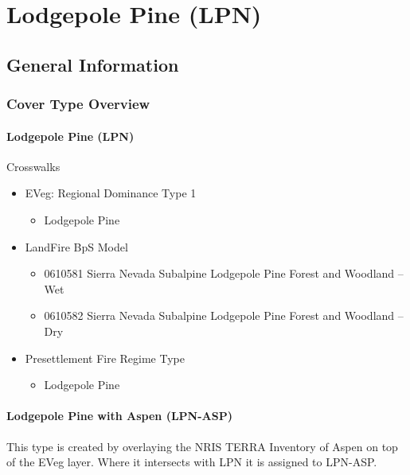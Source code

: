 
\section{Lodgepole Pine (LPN)}

\subsection{General Information}

\subsubsection{Cover Type Overview}

\paragraph{Lodgepole Pine (LPN)}

Crosswalks
\begin{itemize}
	\item EVeg: Regional Dominance Type 1
	\begin{itemize}
		\item Lodgepole Pine
	\end{itemize}

	\item LandFire BpS Model
	\begin{itemize}
		\item 0610581 Sierra Nevada Subalpine Lodgepole Pine Forest and Woodland – Wet
		\item 0610582 Sierra Nevada Subalpine Lodgepole Pine Forest and Woodland – Dry

	\end{itemize}

	\item Presettlement Fire Regime Type
	\begin{itemize}
		\item Lodgepole Pine
	\end{itemize}
\end{itemize}

\paragraph{Lodgepole Pine with Aspen (LPN-ASP)}
This type is created by overlaying the NRIS TERRA Inventory of Aspen on top of the EVeg layer. Where it intersects with LPN it is assigned to LPN-ASP.

